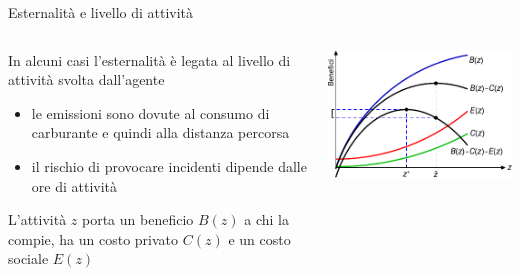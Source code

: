 \documentclass[aspectratio=64,11pt]{beamer}
\begin{document}
\begin{frame}{Esternalità e livello di attività}
\begin{columns}
\begin{column}{.5\columnwidth}
In alcuni casi l’esternalità è legata al livello di attività svolta dall’agente
\begin{itemize}
\item le emissioni sono dovute al consumo di carburante e quindi alla distanza percorsa
\item il rischio di provocare incidenti dipende dalle ore di attività
\end{itemize}
L’attività $z$ porta un beneficio $B(z)$ a chi la compie, ha un costo privato $C(z)$ e un costo sociale $E(z)$ 
\end{column}
\begin{column}{.5\columnwidth}
\begin{center}
\includegraphics[width=\textwidth]{./figure/esternalita-1-color.pdf}
\end{center}
\end{column}
\end{columns}
\end{frame}
\end{document}
